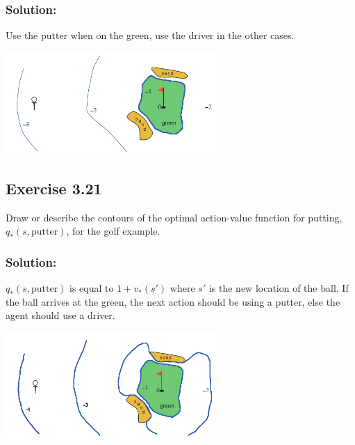 \subsubsection*{Solution:}
Use the putter when on the green, use the driver in the other cases.
\begin{center}
    \includegraphics[width=0.6\textwidth]{chapters_latex/figures/ex_03_20.png}
\end{center}

\subsection*{Exercise 3.21} 
Draw or describe the contours of the optimal action-value function for putting,
$q_*(s, \text{putter})$, for the golf example.

\subsubsection*{Solution:}
$q_*(s, \text{putter})$ is equal to $1 + v_*(s')$ where $s'$ is the new location of the ball. If the ball arrives at the green, the next action should be using a putter, else the agent should use a driver.
\begin{center}
    \includegraphics[width=0.6\textwidth]{chapters_latex/figures/ex_03_21.png}
\end{center}

